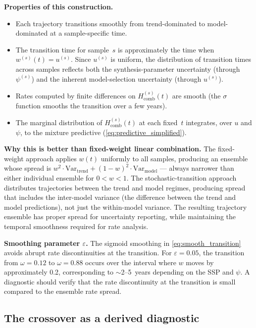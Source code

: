 \documentclass[11pt]{article}
\begin{document}
\textbf{Properties of this construction.}
\begin{itemize}
  \item Each trajectory transitions smoothly from trend-dominated to model-dominated at a sample-specific time.
  \item The transition time for sample~$s$ is approximately the time when $w^{(s)}(t) = u^{(s)}$.  Since $u^{(s)}$ is uniform, the distribution of transition times across samples reflects both the synthesis-parameter uncertainty (through $\psi^{(s)}$) and the inherent model-selection uncertainty (through $u^{(s)}$).
  \item Rates computed by finite differences on $H_{\mathrm{comb}}^{(s)}(t)$ are smooth (the $\sigma$ function smooths the transition over a few years).
  \item The marginal distribution of $H_{\mathrm{comb}}^{(s)}(t)$ at each fixed~$t$ integrates, over $u$ and $\psi$, to the mixture predictive (\cref{eq:predictive_simplified}).
\end{itemize}

\textbf{Why this is better than fixed-weight linear combination.}  The fixed-weight approach applies $w(t)$ uniformly to all samples, producing an ensemble whose spread is $w^2 \cdot \mathrm{Var}_{\mathrm{trend}} + (1-w)^2 \cdot \mathrm{Var}_{\mathrm{model}}$ --- always narrower than either individual ensemble for $0 < w < 1$.  The stochastic-transition approach distributes trajectories between the trend and model regimes, producing spread that includes the inter-model variance (the difference between the trend and model predictions), not just the within-model variance.  The resulting trajectory ensemble has proper spread for uncertainty reporting, while maintaining the temporal smoothness required for rate analysis.

\textbf{Smoothing parameter $\varepsilon$.}  The sigmoid smoothing in \cref{eq:smooth_transition} avoids abrupt rate discontinuities at the transition.  For $\varepsilon = 0.05$, the transition from $\omega = 0.12$ to $\omega = 0.88$ occurs over the interval where $w$ moves by approximately 0.2, corresponding to $\sim$2--5~years depending on the SSP and $\psi$.  A diagnostic should verify that the rate discontinuity at the transition is small compared to the ensemble rate spread.


\subsection{The crossover as a derived diagnostic}
\label{sec:crossover}
\end{document}
